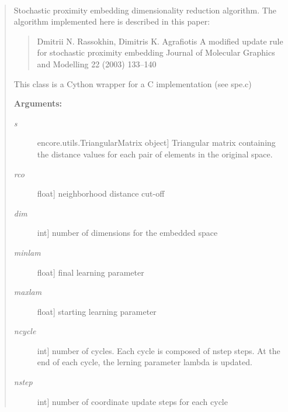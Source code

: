 \documentclass[letterpaper,10pt,english]{sphinxmanual}
\begin{document}
\begin{fulllineitems}
~\begin{quote}

Stochastic proximity embedding dimensionality reduction algorithm. The algorithm implemented here is described in this paper:
\begin{quote}

Dmitrii N. Rassokhin, Dimitris K. Agrafiotis
A modified update rule for stochastic proximity embedding
Journal of Molecular Graphics and Modelling 22 (2003) 133–140
\end{quote}

This class is a Cython wrapper for a C implementation (see spe.c)

\begin{fulllineitems}
\label{index:encore.dimensionality_reduction.stochasticproxembed.run}
\textbf{Arguments:}
\begin{description}
\item[{\emph{s}}] \leavevmode{[}encore.utils.TriangularMatrix object{]}
Triangular matrix containing the distance values for each pair of elements in the original space.

\item[{\emph{rco}}] \leavevmode{[}float{]}
neighborhood distance cut-off

\item[{\emph{dim}}] \leavevmode{[}int{]}
number of dimensions for the embedded space

\item[{\emph{minlam}}] \leavevmode{[}float{]}
final learning parameter

\item[{\emph{maxlam}}] \leavevmode{[}float{]}
starting learning parameter

\item[{\emph{ncycle}}] \leavevmode{[}int{]}
number of cycles. Each cycle is composed of nstep steps. At the end of each cycle, the lerning parameter lambda is updated.

\item[{\emph{nstep}}] \leavevmode{[}int{]}
number of coordinate update steps for each cycle


\end{description}
\end{fulllineitems}
\end{quote}
\end{fulllineitems}
\end{document}
